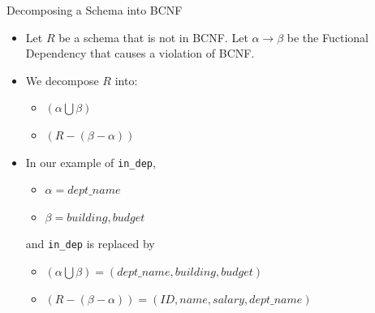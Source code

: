 \documentclass[aspectratio=169]{beamer}
\begin{document}
\begin{frame}{Decomposing a Schema into BCNF}
    \begin{itemize}
        \item Let $R$ be a schema that is not in BCNF. Let $\alpha \rightarrow \beta$ be the Fuctional Dependency that causes a violation of BCNF.
        \item We decompose $R$ into:
            \begin{itemize}
                \item $(\alpha \bigcup \beta)$
                \item $(R - (\beta - \alpha))$
            \end{itemize}
        \item In our example of \texttt{in\_dep},
            \begin{itemize}
                \item $\alpha = dept\_name$
                \item $\beta = building, budget$
            \end{itemize}
        and \texttt{in\_dep} is replaced by
            \begin{itemize}
                \item $(\alpha \bigcup \beta) = (dept\_name, building, budget)$
                \item $(R - (\beta - \alpha)) = (ID, name, salary, dept\_name)$
            \end{itemize}
    \end{itemize}
\end{frame}
\end{document}
